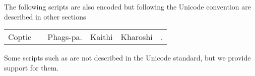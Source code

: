 The following scripts are also encoded but following the Unicode
convention are described in other sections

\begin{center}
\begin{tabular}{llllll}
Coptic &\nameref{s:glagolitic} &Phags-pa. &Kaithi &Kharoshi &\nameref{s:brahmi}.\\
\end{tabular}
\end{center}

Some scripts such as  are not described in the Unicode standard, but we provide support for them.





























\ifscriptolmec
  
\fi
